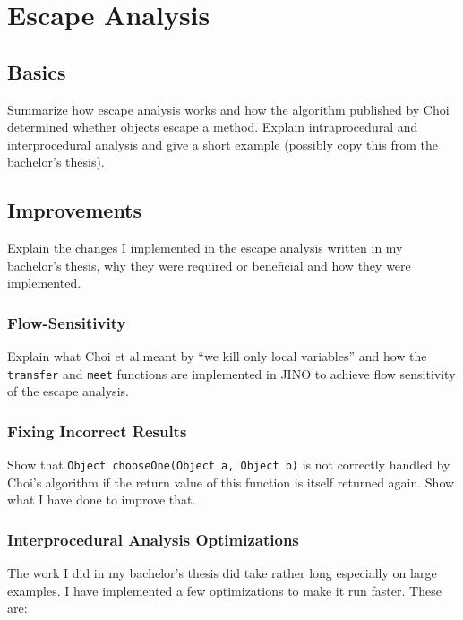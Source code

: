 
\chapter{Escape Analysis}
	\label{chapter:ea}

	\section{Basics}
		\label{sec:ea:basics}
		Summarize how escape analysis works and how the algorithm published by Choi determined whether objects escape
		a method. Explain intraprocedural and interprocedural analysis and give a short example (possibly copy this from the
		bachelor's thesis).

	\section{Improvements}
		\label{sec:ea:improvements}
		Explain the changes I implemented in the escape analysis written in my bachelor's thesis, why they were required or
		beneficial and how they were implemented.

		\subsection{Flow-Sensitivity}
			\label{subsec:ea:improvements:flow-sensitivity}
			Explain what Choi et al.\@ meant by \enquote{we kill only local variables} and how the \texttt{transfer} and
			\texttt{meet} functions are implemented in JINO to achieve flow sensitivity of the escape analysis.

		\subsection{Fixing Incorrect Results}
			\label{subsec:ea:improvements:bug}
			Show that \texttt{Object chooseOne(Object a, Object b)} is not correctly handled by Choi's algorithm if the return
			value of this function is itself returned again. Show what I have done to improve that.

		\subsection{Interprocedural Analysis Optimizations}
			\label{subsec:ea:improvements:opt}
			The work I did in my bachelor's thesis did take rather long especially on large examples. I have implemented a few
			optimizations to make it run faster. These are:

